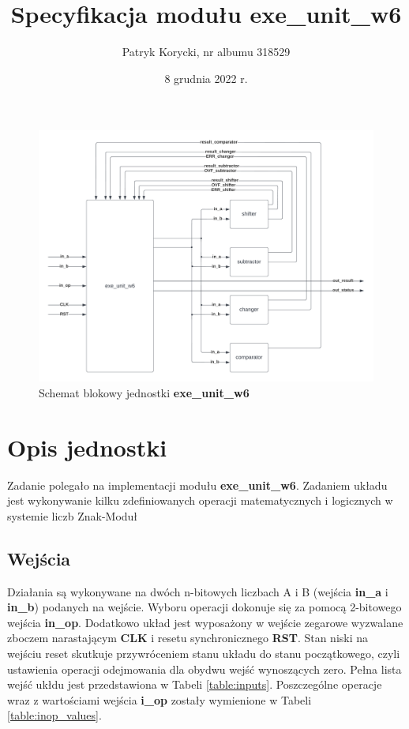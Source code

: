 \documentclass[12pt]{article}
\title{\textbf{Specyfikacja modułu exe\_unit\_w6}}
\author{Patryk Korycki, nr albumu 318529}
\date{8 grudnia 2022 r.}
\begin{document}
	
	\begin{figure}[!h]
		\begin{center}
			\vspace{-20pt}
			\includegraphics[width=\textwidth]{Obrazki/Schemat_blokowy.png}
			\caption*{Schemat blokowy jednostki \textbf{exe\_unit\_w6}}
				\label{figure:schematic}
	\end{center}
	\end{figure}
	
	
	\section*{Opis jednostki}
	Zadanie polegało na implementacji modułu \textbf{exe\_unit\_w6}. Zadaniem układu jest wykonywanie kilku zdefiniowanych operacji matematycznych i logicznych w systemie liczb Znak-Moduł
	
	\subsection*{Wejścia}
	Działania są wykonywane na dwóch n-bitowych liczbach A i B (wejścia \textbf{in\_a} i \textbf{in\_b}) podanych na wejście. Wyboru operacji dokonuje się za pomocą 2-bitowego wejścia \textbf{in\_op}. Dodatkowo układ jest wyposażony w wejście zegarowe wyzwalane zboczem narastającym \textbf{CLK} i resetu synchronicznego \textbf{RST}. Stan niski na wejściu reset skutkuje przywróceniem stanu układu do stanu początkowego, czyli ustawienia operacji odejmowania dla obydwu wejść wynoszących zero. Pełna lista wejść ukłdu jest przedstawiona w Tabeli \ref{table:inputs}. Poszczególne operacje wraz z wartościami wejścia \textbf{i\_op} zostały wymienione w Tabeli \ref{table:inop_values}.  
	
\end{document}
